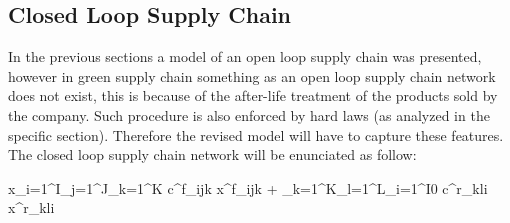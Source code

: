 \begin{doublespace}
\subsection{Closed Loop Supply Chain}
In the previous sections a model of an open loop supply chain was presented, however in green supply chain something as an open loop supply chain network does not exist, this is because of the after-life treatment of the products sold by the company. Such procedure is also enforced by hard laws (as analyzed in the specific section). Therefore the revised model will have to capture these features. The closed loop supply chain network will be enunciated as follow:

\begin{mini!}
	{x}{\sum_{i=1}^{I}\sum_{j=1}^{J}\sum_{k=1}^{K} c^f_{ijk} x^f_{ijk}  + \sum_{k=1}^{K}\sum_{l=1}^{L}\sum_{i=1}^{I0} c^r_{kli} x^r_{kli}}{}{}
\end{mini!}


\end{doublespace}
